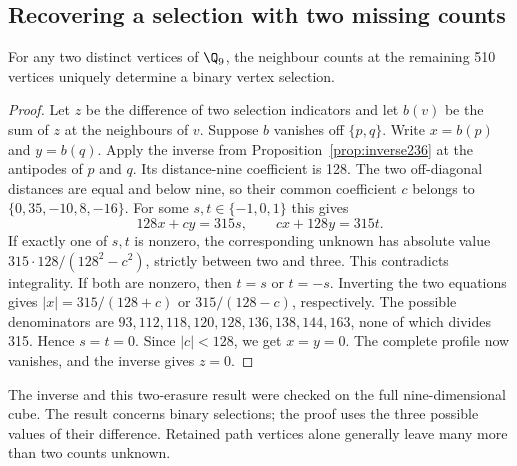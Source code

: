 \subsection{Recovering a selection with two missing counts}\label{sec:erasure237}
\begin{proposition}
For any two distinct vertices of $\Q_9$, the neighbour counts at the
remaining 510 vertices uniquely determine a binary vertex selection.
\end{proposition}
\begin{proof}
Let $z$ be the difference of two selection indicators and let $b(v)$
be the sum of $z$ at the neighbours of $v$. Suppose $b$ vanishes off
$\{p,q\}$. Write $x=b(p)$ and $y=b(q)$. Apply the inverse from
Proposition~\ref{prop:inverse236} at the antipodes of $p$ and $q$.
Its distance-nine coefficient is 128. The two off-diagonal distances
are equal and below nine, so their common coefficient $c$ belongs to
$\{0,35,-10,8,-16\}$. For some $s,t\in\{-1,0,1\}$ this gives
\[
 128x+cy=315s,\qquad cx+128y=315t.
\]
If exactly one of $s,t$ is nonzero, the corresponding unknown has
absolute value $315\cdot128/(128^2-c^2)$, strictly between two and
three. This contradicts integrality. If both are nonzero, then $t=s$
or $t=-s$. Inverting the two equations gives
$|x|=315/(128+c)$ or $315/(128-c)$, respectively. The possible
denominators are $93,112,118,120,128,136,138,144,163$, none of which
divides 315. Hence $s=t=0$. Since $|c|<128$, we get $x=y=0$.
The complete profile now vanishes, and the inverse gives $z=0$.
\end{proof}
The inverse and this two-erasure result were checked on the full
nine-dimensional cube. The result concerns binary selections; the proof
uses the three possible values of their difference. Retained path
vertices alone generally leave many more than two counts unknown.

